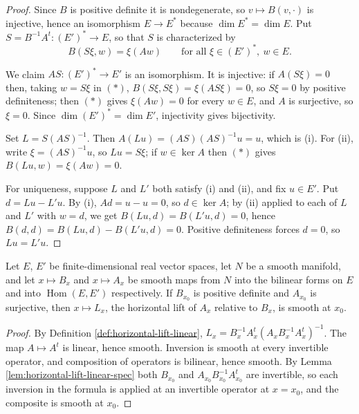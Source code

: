 \begin{proof}
\leanok
{}
Since $B$ is positive definite it is nondegenerate, so $v \mapsto B(v,\cdot)$ is injective, hence an isomorphism $E \to E^*$ because $\dim E^* = \dim E$. Put $S = B^{-1}A^t : (E')^* \to E$, so that $S$ is characterized by
\begin{equation}
B(S\xi, w) = \xi(Aw) \qquad \text{for all } \xi \in (E')^*,\ w \in E. \tag{$*$}
\end{equation}

We claim $AS : (E')^* \to E'$ is an isomorphism. It is injective: if $A(S\xi) = 0$ then, taking $w = S\xi$ in $(*)$, $B(S\xi, S\xi) = \xi(A S\xi) = 0$, so $S\xi = 0$ by positive definiteness; then $(*)$ gives $\xi(Aw) = 0$ for every $w \in E$, and $A$ is surjective, so $\xi = 0$. Since $\dim (E')^* = \dim E'$, injectivity gives bijectivity.

Set $L = S(AS)^{-1}$. Then $A(Lu) = (AS)(AS)^{-1}u = u$, which is (i). For (ii), write $\xi = (AS)^{-1}u$, so $Lu = S\xi$; if $w \in \ker A$ then $(*)$ gives $B(Lu, w) = \xi(Aw) = 0$.

For uniqueness, suppose $L$ and $L'$ both satisfy (i) and (ii), and fix $u \in E'$. Put $d = Lu - L'u$. By (i), $Ad = u - u = 0$, so $d \in \ker A$; by (ii) applied to each of $L$ and $L'$ with $w = d$, we get $B(Lu, d) = B(L'u, d) = 0$, hence $B(d,d) = B(Lu,d) - B(L'u,d) = 0$. Positive definiteness forces $d = 0$, so $Lu = L'u$.
\end{proof}

\begin{lemma}
\label{lem:horizontal-lift-smooth-in-data}
\leanok
{}
Let $E$, $E'$ be finite-dimensional real vector spaces, let $N$ be a smooth manifold, and let $x \mapsto B_x$ and $x \mapsto A_x$ be smooth maps from $N$ into the bilinear forms on $E$ and into $\operatorname{Hom}(E,E')$ respectively. If $B_{x_0}$ is positive definite and $A_{x_0}$ is surjective, then $x \mapsto L_x$, the horizontal lift of $A_x$ relative to $B_x$, is smooth at $x_0$.
\end{lemma}

\begin{proof}
\leanok
{}
By Definition \ref{def:horizontal-lift-linear}, $L_x = B_x^{-1}A_x^t(A_xB_x^{-1}A_x^t)^{-1}$. The map $A \mapsto A^t$ is linear, hence smooth. Inversion is smooth at every invertible operator, and composition of operators is bilinear, hence smooth. By Lemma \ref{lem:horizontal-lift-linear-spec} both $B_{x_0}$ and $A_{x_0}B_{x_0}^{-1}A_{x_0}^t$ are invertible, so each inversion in the formula is applied at an invertible operator at $x = x_0$, and the composite is smooth at $x_0$.
\end{proof}

